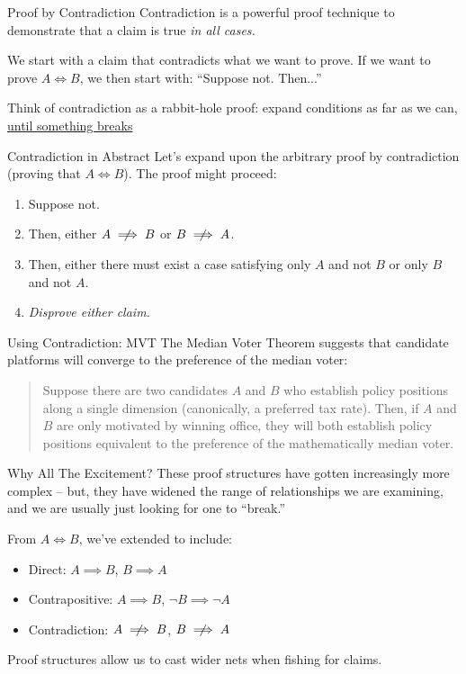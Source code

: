\documentclass[10pt]{beamer}
\begin{document}
\begin{frame}{Proof by Contradiction}
    Contradiction is a powerful proof technique to demonstrate that a claim is true \emph{in all cases.}

    We start with a claim that contradicts what we want to prove. If we want to prove $A \iff B$, we then start with: ``Suppose not. Then...''

    Think of contradiction as a rabbit-hole proof: expand conditions as far as we can, \underline{until something breaks}

\end{frame}


\begin{frame}{Contradiction in Abstract}
    Let's expand upon the arbitrary proof by contradiction (proving that $A \iff B$). The proof might proceed:

    \begin{enumerate}
        \item Suppose not.
        \item Then, either $A \centernot\implies B$ or $B \centernot\implies A$.
        \item Then, either there must exist a case satisfying only $A$ and not $B$ or only $B$ and not $A$.
        \item \emph{Disprove either claim.}
    \end{enumerate}
\end{frame}

\begin{frame}{Using Contradiction: MVT}
    The Median Voter Theorem suggests that candidate platforms will converge to the preference of the median voter:

    \begin{quote}
        Suppose there are two candidates $A$ and $B$ who establish policy positions along a single dimension (canonically, a preferred tax rate). Then, if $A$ and $B$ are only motivated by winning office, they will both establish policy positions equivalent to the preference of the mathematically median voter.
    \end{quote}
\end{frame}


\begin{frame}{Why All The Excitement?}
    These proof structures have gotten increasingly more complex -- but, they have widened the range of relationships we are examining, and we are usually just looking for one to ``break.''

    From $A \iff B$, we've extended to include:
    \begin{itemize}
        \item Direct: $A \implies B$, $B \implies A$
        \item Contrapositive: $A \implies B$, $\neg B \implies \neg A$
        \item Contradiction: $A \centernot\implies B$, $B \centernot\implies A$
    \end{itemize}

    Proof structures allow us to cast wider nets when fishing for claims.
\end{frame}
\end{document}
